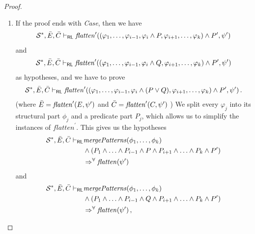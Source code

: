 \documentclass{article}
\newcommand{\RL}{\mathsf{RL}}
\begin{document}
\begin{proof}
\begin{enumerate}
    \item If the proof ends with \emph{Case}, then we have
        \begin{equation*}
            \mathcal{S}^*, \Bar{E}, \Bar{C} \vdash_\RL
            \mathit{flatten}^\prime((\varphi_1, \ldots, \varphi_{i-1}, \varphi_i \land P, \varphi_{i+1}, \ldots, \varphi_k) \land P^\prime, \psi^\prime)
        \end{equation*}
        and
        \begin{equation*}
            \mathcal{S}^*, \Bar{E}, \Bar{C} \vdash_\RL
            \mathit{flatten}^\prime((\varphi_1, \ldots, \varphi_{i-1}, \varphi_i \land Q, \varphi_{i+1}, \ldots, \varphi_k) \land P^\prime, \psi^\prime) 
        \end{equation*}
        as hypotheses, and we have to prove
        \begin{equation*}
            \mathcal{S}^*, \Bar{E}, \Bar{C} \vdash_\RL
            \mathit{flatten}^\prime((\varphi_1, \ldots, \varphi_{i-1}, \varphi_i \land (P \lor Q), \varphi_{i+1}, \ldots, \varphi_k) \land P^\prime, \psi^\prime)               \, .
        \end{equation*}
        (where $\Bar{E} = \mathit{flatten}^\prime(E, \psi^\prime)$
         and $\Bar{C} = \mathit{flatten}^\prime(C, \psi^\prime)$
        )
        We split every $\varphi_j$ into its structural part $\phi_j$ and a predicate part $P_j$,
        which allows us to simplify the instances of $\mathit{flatten}^\prime$.
        This gives us the hypotheses
         \begin{align*}
            \mathcal{S}^*, \Bar{E}, \Bar{C}
            \vdash_\RL
            & \mathit{mergePatterns}(\phi_1, \ldots, \phi_k)
            \\ & \land (P_1 \land \ldots \land P_{i-1} \land P \land P_{i+1} \land \ldots \land P_k \land P^\prime) 
            \\ & \Rightarrow^\forall \mathit{flatten}(\psi^\prime) 
        \end{align*}
        and
        \begin{align*}
            \mathcal{S}^*, \Bar{E}, \Bar{C}
            \vdash_\RL
            & \mathit{mergePatterns}(\phi_1, \ldots, \phi_k)
            \\ & \land (P_1 \land \ldots \land P_{i-1} \land Q \land P_{i+1} \land \ldots \land P_k \land P^\prime) 
            \\ & \Rightarrow^\forall \mathit{flatten}(\psi^\prime) \, ,
        \end{align*}

\end{enumerate}
\end{proof}
\end{document}
